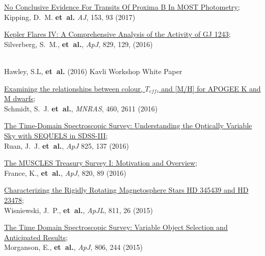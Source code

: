 \documentclass{article}
\begin{document}
\begin{llist}
\begin{etaremune}[leftmargin=10pt]
\item{\sc \href{http://arxiv.org/abs/1609.08718}{\color{blue}No Conclusive Evidence For Transits Of Proxima B In MOST Photometry;}} \\  Kipping, D.~M. {\bf et~al.} {\em AJ}, 153, 93 (2017)

\item{\sc \href{http://arxiv.org/abs/1607.03886}{\color{blue}Kepler Flares IV: A Comprehensive Analysis of the Activity of GJ 1243}};\\ Silverberg, S.~M., {\bf et~al.}, {\em ApJ}, 829, 129, (2016)

\item{\sc\href{http://arxiv.org/abs/1607.04302}{\color{blue}{\sc Maximizing Science in the Era of LSST, Stars Study Group Report: Rotation and \\Magnetic Activity in the Galactic Field Population and in Open Star Clusters}}}\\
Hawley, S.L, {\bf et~al.} (2016) Kavli Workshop White Paper

\item{\sc \href{http://adsabs.harvard.edu/abs/2016MNRAS.460.2611S}{\color{blue}Examining the relationships between colour, $T_{eff}$, and [M/H] for APOGEE K and M dwarfs}};\\ Schmidt, S.~J. {\bf et~al.}, {\em MNRAS}, 460, 2611 (2016)

\item{\sc \href{http://arxiv.org/abs/1602.02752}{\color{blue}The Time-Domain Spectroscopic Survey: Understanding the Optically Variable Sky with SEQUELS in SDSS-III}};\\ Ruan, J.~J. {\bf et~al.}, {\em ApJ} 825, 137 (2016)

\item{\sc \href{http://adsabs.harvard.edu/abs/2016ApJ...820...89F}{\color{blue}The MUSCLES Treasury Survey I: Motivation and Overview}};\\ France, K., {\bf et~al.}, {\em ApJ}, 820, 89 (2016)

\item{\sc \href{http://arxiv.org/abs/1509.00128}{\color{blue}Characterizing the Rigidly Rotating Magnetosphere Stars HD 345439 and HD 23478}};\\
Wisniewski, J.~P., {\bf et~al.}, {\em ApJL}, 811, 26 (2015)

\item{\sc \href{http://arxiv.org/abs/1505.00760}{\color{blue}The Time Domain Spectroscopic Survey: Variable Object Selection and\\ Anticipated Results}};\\
Morganson, E., {\bf et~al.}, {\em ApJ}, 806, 244 (2015)


\end{etaremune}
\end{llist}
\end{document}
